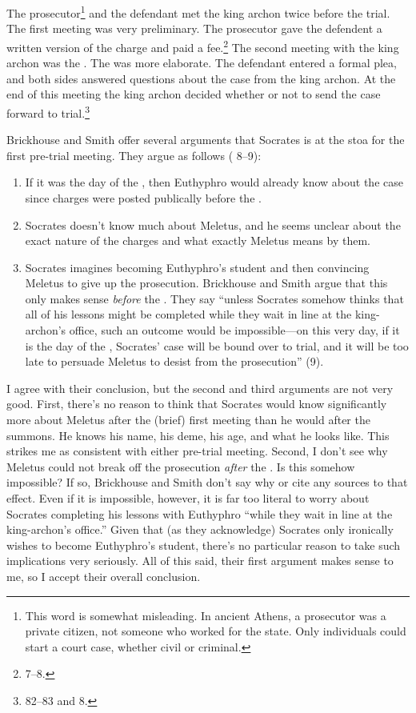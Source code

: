 \documentclass[11pt]{article}
\begin{document}
The prosecutor\footnote{This word is somewhat misleading.  In ancient Athens, a prosecutor was a private citizen, not someone who worked for the state.  Only individuals could start a court case, whether civil or criminal.} and the defendant met the king archon twice before the trial.  The first meeting was very preliminary.  The prosecutor gave the defendent a written version of the charge and paid a fee.\footnote {\citet{brickhouse2004} 7--8.}  The second meeting with the king archon was the .  The  was more elaborate.  The defendant entered a formal plea, and both sides answered questions about the case from the king archon.  At the end of this meeting the king archon decided whether or not to send the case forward to trial.\footnote {\citet{burnet1924} 82--83 and \citet{brickhouse2004} 8.}

Brickhouse and Smith offer several arguments that Socrates is at the stoa for the first pre-trial meeting.  They argue as follows (\citet{brickhouse2004} 8--9):
\begin{enumerate}
    \item If it was the day of the , then Euthyphro would already know about the case since charges were posted publically before the .
    \item Socrates doesn't know much about Meletus, and he seems unclear about the exact nature of the charges and what exactly Meletus means by them.
    \item Socrates imagines becoming Euthyphro's student and then convincing Meletus to give up the prosecution.  Brickhouse and Smith argue that this only makes sense \textit{before} the .  They say ``unless Socrates somehow thinks that all of his lessons might be completed while they wait in line at the king-archon's office, such an outcome would be impossible---on this very day, if it is the day of the , Socrates' case will be bound over to trial, and it will be too late to persuade Meletus to desist from the prosecution'' (9).
\end{enumerate}

I agree with their conclusion, but the second and third arguments are not very good.  First, there's no reason to think that Socrates would know significantly more about Meletus after the (brief) first meeting than he would after the summons.  He knows his name, his deme, his age, and what he looks like.  This strikes me as consistent with either pre-trial meeting.  Second, I don't see why Meletus could not break off the prosecution \textit{after} the .  Is this somehow impossible? If so, Brickhouse and Smith don't say why or cite any sources to that effect.  Even if it is impossible, however, it is far too literal to worry about Socrates completing his lessons with Euthyphro ``while they wait in line at the king-archon's office.'' Given that (as they acknowledge) Socrates only ironically wishes to become Euthyphro's student, there's no particular reason to take such implications very seriously.  All of this said, their first argument makes sense to me, so I accept their overall conclusion.
\end{document}
